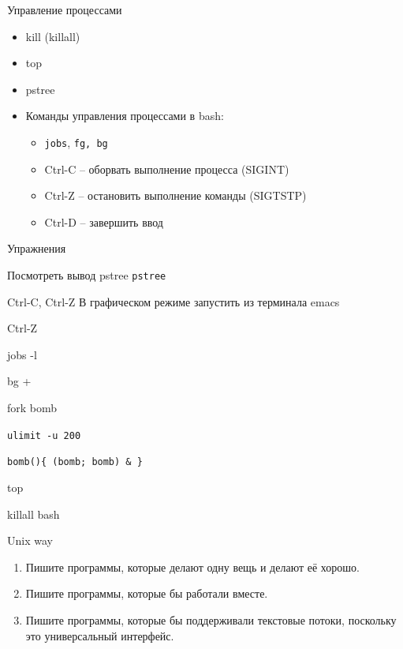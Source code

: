 \documentclass[ignorenonframetext, professionalfonts, hyperref={pdftex, unicode}]{beamer}
\begin{document}
\begin{frame}{Управление процессами}
  \begin{itemize}
    \item kill (killall)
    \item top
    \item pstree
    \item Команды управления процессами в bash: 
      \begin{itemize}
        \item {\tt jobs}, {\tt fg, \tt bg}
        \item Ctrl-C -- оборвать выполнение процесса (SIGINT)
        \item Ctrl-Z -- остановить выполнение команды (SIGTSTP)
        \item Ctrl-D -- завершить ввод
      \end{itemize}
  \end{itemize}
\end{frame}


\begin{frame}{Упражнения}
  \begin{block}{Посмотреть вывод pstree}
    {\tt pstree}
  \end{block}
  \pause
  \begin{block}{Ctrl-C, Ctrl-Z}
    В графическом режиме запустить из терминала emacs

    Ctrl-Z

    jobs -l

    bg +
  \end{block}
  \pause
  \begin{block}{fork bomb}

    {\tt ulimit -u 200} 

    {\tt bomb()\{ (bomb; bomb) \& \} }

    top

    killall bash

  \end{block}
\end{frame}


\begin{frame}{Unix way}
  \begin{enumerate}
    \item Пишите программы, которые делают одну вещь и делают её хорошо.
    \item Пишите программы, которые бы работали вместе.
    \item Пишите программы, которые бы поддерживали текстовые потоки, поскольку это универсальный интерфейс. 
  \end{enumerate}
\end{frame}
\end{document}
